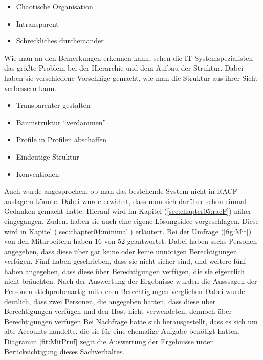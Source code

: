 \begin{itemize}
	\item Chaotische Organisation
	\item Intransparent
	\item Schreckliches durcheinander
\end{itemize}

Wie man an den Bemerkungen erkennen kann, sehen die IT-Systemspezialisten das größte Problem bei der Hierarchie und dem Aufbau der Struktur.
Dabei haben sie verschiedene Vorschläge gemacht, wie man die Struktur aus ihrer Sicht verbessern kann.

\begin{itemize}
	\item Transparenter gestalten
	\item Baumstruktur "`verdammen"'
	\item Profile in Profilen abschaffen
	\item Eindeutige Struktur
	\item Konventionen
\end{itemize}
Auch wurde angesprochen, ob man das bestehende System nicht in RACF auslagern könnte.
Dabei wurde erwähnt, dass man sich darüber schon einmal Gedanken gemacht hatte.
Hierauf wird im Kapitel (\ref{sec:chapter05:racF}) näher eingegangen.
Zudem haben sie auch eine eigene Lösungsidee vorgeschlagen.
Diese wird in Kapitel (\ref{sec:chapter04:minimal}) erläutert.
\newline
\newline
Bei der Umfrage (\ref{fig:Mit}) von den Mitarbeitern haben 16 von 52 geantwortet.
Dabei haben sechs Personen angegeben, dass diese über gar keine oder keine unnötigen Berechtigungen verfügen.
Fünf haben geschrieben, dass sie nicht sicher sind, und weitere fünf haben angegeben, dass diese über Berechtigungen verfügen, die sie eigentlich nicht bräuchten.
Nach der Auswertung der Ergebnisse wurden die Ausssagen der Personen stichprobenartig mit deren Berechtigungen verglichen
Dabei wurde deutlich, dass zwei Personen, die angegeben hatten, dass diese über Berechtigungen verfügen und den Host nicht verwendeten, dennoch über Berechtigungen verfügen
Bei Nachfrage hatte sich herausgestellt, dass es sich um alte Accounts handelte, die sie für eine ehemalige Aufgabe benötigt hatten.
Diagramm \ref{fit:MitPruf} zegit die Auswertung der Ergebnisse unter Berücksichtigung dieses Sachverhaltes.
